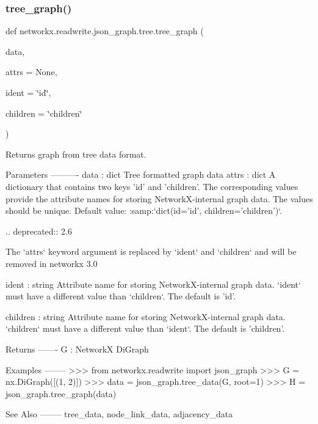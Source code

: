 \subsubsection{\texorpdfstring{tree\+\_\+graph()}{tree\_graph()}}
{\footnotesize\ttfamily def networkx.\+readwrite.\+json\+\_\+graph.\+tree.\+tree\+\_\+graph (\begin{DoxyParamCaption}\item[{}]{data,  }\item[{}]{attrs = {\ttfamily None},  }\item[{}]{ident = {\ttfamily \char`\"{}id\char`\"{}},  }\item[{}]{children = {\ttfamily \char`\"{}children\char`\"{}} }\end{DoxyParamCaption})}

\begin{DoxyVerb}Returns graph from tree data format.

Parameters
----------
data : dict
    Tree formatted graph data
attrs : dict
    A dictionary that contains two keys 'id' and 'children'. The
    corresponding values provide the attribute names for storing
    NetworkX-internal graph data. The values should be unique. Default
    value: :samp:`dict(id='id', children='children')`.

    .. deprecated:: 2.6

       The `attrs` keyword argument is replaced by `ident` and `children`
       and will be removed in networkx 3.0

ident : string
    Attribute name for storing NetworkX-internal graph data. `ident` must
    have a different value than `children`. The default is 'id'.

children : string
    Attribute name for storing NetworkX-internal graph data. `children`
    must have a different value than `ident`. The default is 'children'.

Returns
-------
G : NetworkX DiGraph

Examples
--------
>>> from networkx.readwrite import json_graph
>>> G = nx.DiGraph([(1, 2)])
>>> data = json_graph.tree_data(G, root=1)
>>> H = json_graph.tree_graph(data)

See Also
--------
tree_data, node_link_data, adjacency_data
\end{DoxyVerb}
 
